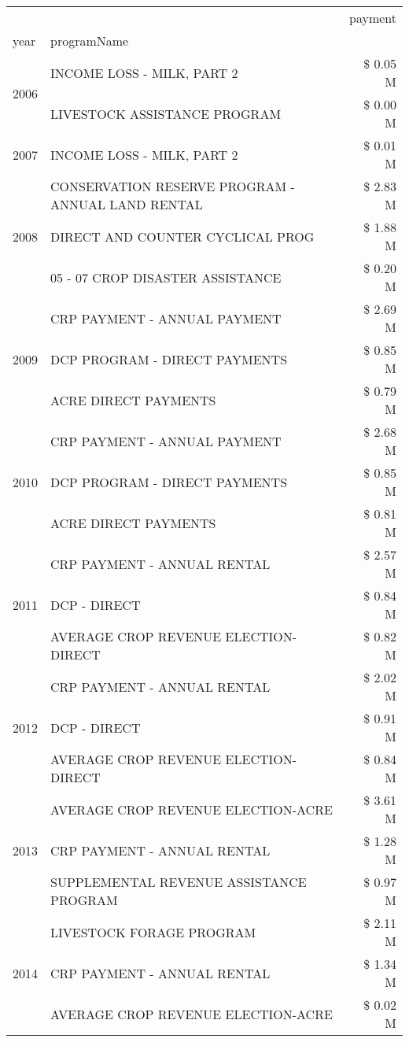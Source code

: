 \begin{tabular}{llr}
\toprule
 &  & payment \\
year & programName &  \\
\midrule
\multirow[t]{2}{*}{2006} & INCOME LOSS - MILK, PART 2 & \$ 0.05 M \\
 & LIVESTOCK ASSISTANCE PROGRAM & \$ 0.00 M \\
\cline{1-3}
2007 & INCOME LOSS - MILK, PART 2 & \$ 0.01 M \\
\cline{1-3}
\multirow[t]{3}{*}{2008} & CONSERVATION RESERVE PROGRAM - ANNUAL LAND RENTAL & \$ 2.83 M \\
 & DIRECT AND COUNTER CYCLICAL PROG & \$ 1.88 M \\
 & 05 - 07 CROP DISASTER ASSISTANCE & \$ 0.20 M \\
\cline{1-3}
\multirow[t]{3}{*}{2009} & CRP PAYMENT - ANNUAL PAYMENT & \$ 2.69 M \\
 & DCP PROGRAM - DIRECT PAYMENTS & \$ 0.85 M \\
 & ACRE DIRECT PAYMENTS & \$ 0.79 M \\
\cline{1-3}
\multirow[t]{3}{*}{2010} & CRP PAYMENT - ANNUAL PAYMENT & \$ 2.68 M \\
 & DCP PROGRAM - DIRECT PAYMENTS & \$ 0.85 M \\
 & ACRE DIRECT PAYMENTS & \$ 0.81 M \\
\cline{1-3}
\multirow[t]{3}{*}{2011} & CRP PAYMENT - ANNUAL RENTAL & \$ 2.57 M \\
 & DCP - DIRECT & \$ 0.84 M \\
 & AVERAGE CROP REVENUE ELECTION-DIRECT & \$ 0.82 M \\
\cline{1-3}
\multirow[t]{3}{*}{2012} & CRP PAYMENT - ANNUAL RENTAL & \$ 2.02 M \\
 & DCP - DIRECT & \$ 0.91 M \\
 & AVERAGE CROP REVENUE ELECTION-DIRECT & \$ 0.84 M \\
\cline{1-3}
\multirow[t]{3}{*}{2013} & AVERAGE CROP REVENUE ELECTION-ACRE & \$ 3.61 M \\
 & CRP PAYMENT - ANNUAL RENTAL & \$ 1.28 M \\
 & SUPPLEMENTAL REVENUE ASSISTANCE PROGRAM & \$ 0.97 M \\
\cline{1-3}
\multirow[t]{3}{*}{2014} & LIVESTOCK FORAGE PROGRAM & \$ 2.11 M \\
 & CRP PAYMENT - ANNUAL RENTAL & \$ 1.34 M \\
 & AVERAGE CROP REVENUE ELECTION-ACRE & \$ 0.02 M \\
\cline{1-3}

\end{tabular}

